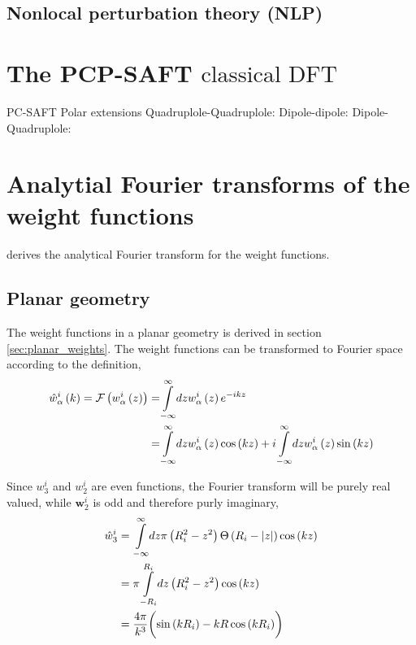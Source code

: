 \documentclass[12pt, letterpaper]{article}
\newcommand*{\abs}[1]{\lvert#1\rvert}
\newcommand*{\lb}{\ensuremath{\left(}}
\newcommand*{\rb}{\ensuremath{\right)}}
\newcommand{\cdft}{\ensuremath{\text{classical DFT}}\xspace}
\begin{document}
\subsection{Nonlocal perturbation theory (NLP)}
\citet{gloor2004}
\citet{gross2009}

\section{The PCP-SAFT \cdft}

\citet{sauer2017}

PC-SAFT \citet{gross2001}
Polar extensions
Quadruplole-Quadruplole:\citet{gross2005}
Dipole-dipole:\citet{gross2006}
Dipole-Quadruplole: \citet{vrabec2008}



\section{Analytial Fourier transforms of the weight functions}
\citet[Appendix B]{knepley2010} derives the analytical Fourier
transform for the weight functions.

\subsection{Planar geometry}
The weight functions in a planar geometry is derived in section
\ref{sec:planar_weights}. The weight functions can be transformed to
Fourier space according to the definition,
\begin{align}
  \label{eq:fourier}
  \hat{w}_\alpha^i \lb k \rb = \mathcal{F}\lb w_\alpha^i \lb z \rb \rb =& \overset{\infty}{\underset{-\infty}{\int}} dz w_\alpha^i \lb z \rb e^{-i k z} \nonumber \\
  =& \overset{\infty}{\underset{-\infty}{\int}} dz w_\alpha^i \lb z \rb \cos \lb k z \rb + i \overset{\infty}{\underset{-\infty}{\int}} dz w_\alpha^i \lb z \rb \sin \lb k z \rb
\end{align}

Since $w_3^i$ and $w_2^i$ are even functions, the Fourier transform
will be purely real valued, while $\mathbf{w}_2^i$ is odd and
therefore purly imaginary,
\begin{align}
  \hat{w}_3^i &=  \overset{\infty}{\underset{-\infty}{\int}} dz  \pi \lb R_i^2 - z^2 \rb \Theta \lb R_i - \abs{z} \rb \cos \lb k z \rb \nonumber \\
              &=  \pi \overset{R_i}{\underset{-R_i}{\int}} dz  \lb R_i^2 - z^2 \rb \cos \lb k z \rb  \nonumber \\
              &=  \frac{4 \pi}{k^3} \biggl( \sin \lb k R_i \rb - k R\cos \lb k R_i \rb \biggr) \label{eq:w_hat_3}
\end{align}
\end{document}
